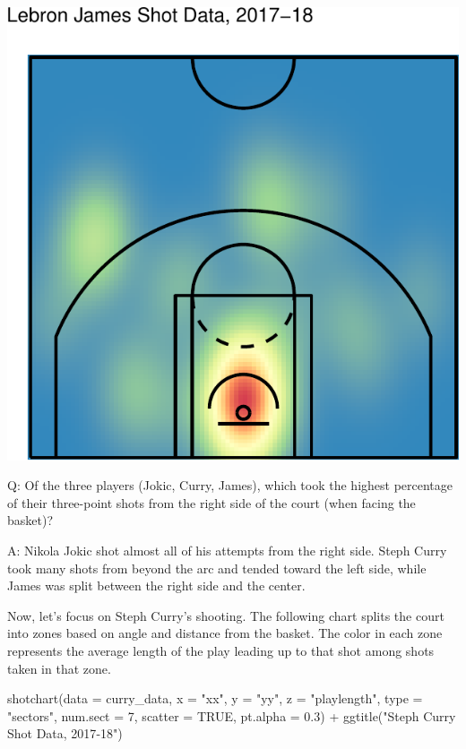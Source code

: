\documentclass[
  11pt,
]{book}
\newenvironment{Shaded}{\begin{snugshade}}{\end{snugshade}}
\newcommand{\AttributeTok}[1]{\textcolor[rgb]{0.77,0.63,0.00}{#1}}
\newcommand{\ConstantTok}[1]{\textcolor[rgb]{0.00,0.00,0.00}{#1}}
\newcommand{\DecValTok}[1]{\textcolor[rgb]{0.00,0.00,0.81}{#1}}
\newcommand{\FloatTok}[1]{\textcolor[rgb]{0.00,0.00,0.81}{#1}}
\newcommand{\FunctionTok}[1]{\textcolor[rgb]{0.00,0.00,0.00}{#1}}
\newcommand{\NormalTok}[1]{#1}
\newcommand{\SpecialCharTok}[1]{\textcolor[rgb]{0.00,0.00,0.00}{#1}}
\newcommand{\StringTok}[1]{\textcolor[rgb]{0.31,0.60,0.02}{#1}}
\theoremstyle{definition}
\theoremstyle{definition}
\theoremstyle{definition}
\theoremstyle{definition}
\theoremstyle{remark}
\begin{document}
\includegraphics{series_files/figure-latex/basketballanalyzer 7-3.pdf}

Q: Of the three players (Jokic, Curry, James), which took the highest percentage of their three-point shots from the right side of the court (when facing the basket)?

A: Nikola Jokic shot almost all of his attempts from the right side. Steph Curry took many shots from beyond the arc and tended toward the left side, while James was split between the right side and the center.

Now, let's focus on Steph Curry's shooting. The following chart splits the court into zones based on angle and distance from the basket. The color in each zone represents the average length of the play leading up to that shot among shots taken in that zone.

\begin{Shaded}
\begin{Highlighting}[]
\FunctionTok{shotchart}\NormalTok{(}\AttributeTok{data =}\NormalTok{ curry\_data, }\AttributeTok{x =} \StringTok{"xx"}\NormalTok{, }\AttributeTok{y =} \StringTok{"yy"}\NormalTok{, }\AttributeTok{z =} \StringTok{"playlength"}\NormalTok{, }\AttributeTok{type =} \StringTok{"sectors"}\NormalTok{,}
    \AttributeTok{num.sect =} \DecValTok{7}\NormalTok{, }\AttributeTok{scatter =} \ConstantTok{TRUE}\NormalTok{, }\AttributeTok{pt.alpha =} \FloatTok{0.3}\NormalTok{) }\SpecialCharTok{+} \FunctionTok{ggtitle}\NormalTok{(}\StringTok{"Steph Curry Shot Data, 2017{-}18"}\NormalTok{)}
\end{Highlighting}
\end{Shaded}
\end{document}

